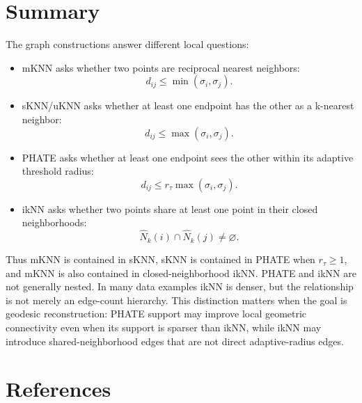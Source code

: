 \documentclass[11pt]{article}
\begin{document}
\section{Summary}

The graph constructions answer different local questions:
\begin{itemize}[leftmargin=2em]
  \item mKNN asks whether two points are reciprocal nearest neighbors:
  \[
    d_{ij}\le\min(\sigma_i,\sigma_j).
  \]
  \item sKNN/uKNN asks whether at least one endpoint has the other as a k-nearest neighbor:
  \[
    d_{ij}\le\max(\sigma_i,\sigma_j).
  \]
  \item PHATE asks whether at least one endpoint sees the other within its adaptive
  threshold radius:
  \[
    d_{ij}\le r_\tau\max(\sigma_i,\sigma_j).
  \]
  \item ikNN asks whether two points share at least one point in their closed neighborhoods:
  \[
    \widehat{N}_k(i)\cap \widehat{N}_k(j)\ne\varnothing.
  \]
\end{itemize}
Thus mKNN is contained in sKNN, sKNN is contained in PHATE when \(r_\tau\ge 1\), and mKNN is
also contained in closed-neighborhood ikNN.  PHATE and ikNN are not generally nested.  In
many data examples ikNN is denser, but the relationship is not merely an edge-count
hierarchy.  This distinction matters when the goal is geodesic reconstruction: PHATE support
may improve local geometric connectivity even when its support is sparser than ikNN, while
ikNN may introduce shared-neighborhood edges that are not direct adaptive-radius edges.

\section*{References}
\end{document}
